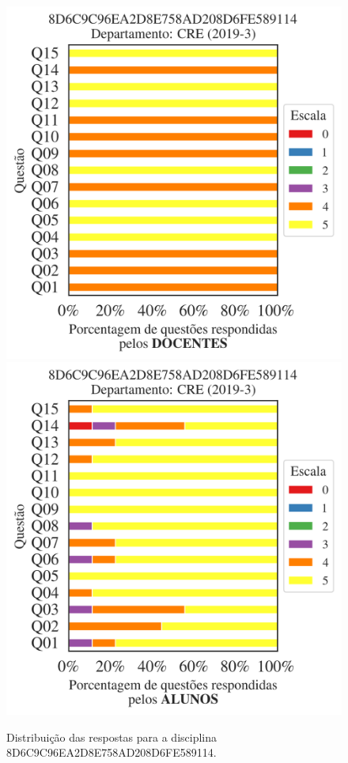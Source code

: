 \documentclass[a4paper,10pt]{article}
\begin{document}
\begin{figure}[h]
\centering
\includegraphics[width=0.485\linewidth]{analise_disciplina_departamento_CRE_8D6C9C96EA2D8E758AD208D6FE589114_docentes.png}
\includegraphics[width=0.485\linewidth]{analise_disciplina_departamento_CRE_8D6C9C96EA2D8E758AD208D6FE589114_alunos.png}
\caption{\label{fig:analise_geral_departamento}                Distribuição das respostas para a disciplina 8D6C9C96EA2D8E758AD208D6FE589114. }
\end{figure}
\end{document}
